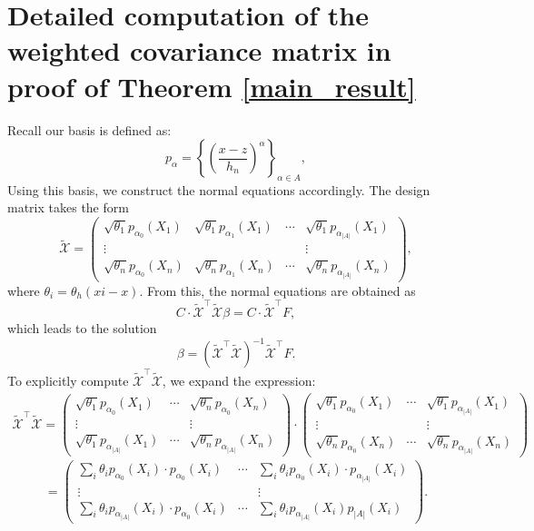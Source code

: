 \documentclass{article}
\begin{document}
\section{Detailed computation of the weighted covariance matrix in proof of Theorem \ref{main_result}} \label{Normal Equations Appendix}

Recall our basis is defined as:
\[
p_{\alpha}= 
\left\{ \left(\frac{x - z}{h_n}\right)^\alpha\right\}_{\alpha\in A},
\]
Using this basis, we construct the normal equations accordingly. The design matrix takes the form
\[
\tilde{\mathscr{X}} = \left(
\begin{array}{cccc}
\sqrt{\theta_1} p_{\alpha_0}(X_1) & \sqrt{\theta_1} p_{\alpha_1}(X_1) & \cdots & \sqrt{\theta_1} p_{\alpha_{|A|}}(X_1) \\
\vdots & & & \vdots \\
\sqrt{\theta_n} p_{\alpha_0}(X_n) & \sqrt{\theta_n} p_{\alpha_1}(X_n) & \cdots & \sqrt{\theta_n} p_{\alpha_{|A|}}(X_n)
\end{array}
\right),
\]
where $\theta_i=\theta_h(xi-x)$.
From this, the normal equations are obtained as
\[
C \cdot \tilde{\mathscr{X}}^\top \tilde{\mathscr{X}} \beta = C \cdot  \tilde{\mathscr{X}}^\top F,
\]
which leads to the solution
\[
\beta = (\tilde{\mathscr{X}}^\top \tilde{\mathscr{X}})^{-1} \tilde{\mathscr{X}}^\top F.
\]
To explicitly compute $\tilde{\mathscr{X}}^{\top} \tilde{\mathscr{X}}$, we expand the expression: 
\begin{align*}
\tilde{\mathscr{X}}^\top \tilde{\mathscr{X}}  = 
\left(
\begin{array}{ccc}
\sqrt{\theta_1} p_{\alpha_0}(X_1) & \cdots & \sqrt{\theta_n} p_{\alpha_{0}}(X_n) \\
\vdots &  & \vdots \\
\sqrt{\theta_1} p_{\alpha_{|A|}}(X_1) & \cdots & \sqrt{\theta_n} p_{\alpha_{|A|}}(X_n) 
\end{array}
\right)\cdot 
\left(
\begin{array}{ccc}
\sqrt{\theta_1} p_{\alpha_0}(X_1)  & \cdots & \sqrt{\theta_1} p_{\alpha_{|A|}}(X_1) \\
\vdots & & \vdots \\
\sqrt{\theta_n} p_{\alpha_0}(X_n)  & \cdots & \sqrt{\theta_n} p_{\alpha_{|A|}}(X_n) 
\end{array}
\right)
\end{align*}
\[
=
\left(
\begin{array}{ccc}
\sum_{i}{\theta_i} p_{\alpha_0}(X_i) \cdot p_{\alpha_0}(X_i)  & \cdots & \sum_i {\theta_i} p_{\alpha_0}(X_i) \cdot p_{\alpha_{|A|}}(X_i) \\
\vdots & & \vdots \\
\sum_i {\theta_i} p_{\alpha_{|A|}}(X_i) \cdot p_{\alpha_0}(X_i)  & \cdots & \sum_i {\theta_i} p_{\alpha_{|A|}}(X_i) p_{|A|}(X_i) 
\end{array}
\right).
\]
\end{document}
